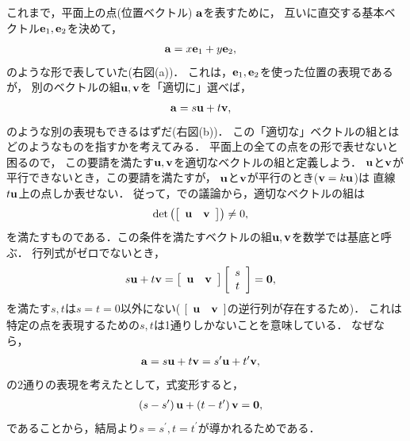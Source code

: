 これまで，平面上の点(位置ベクトル) ${\bf a}$を表すために，
互いに直交する基本ベクトル${\bf e}_{1},{\bf e}_{2}$を決めて，
\begin{align}
{\bf a} & =x{\bf e}_{1}+y{\bf e}_{2}, \label{a=xe1+ye2_2D}
\end{align}
のような形で表していた(右図(a))．
これは，${\bf e}_{1},{\bf e}_{2}$を使った位置の表現であるが，
別のベクトルの組${\bf u},{\bf v}$を「適切に」選べば，
%
\begin{align}
{\bf a} & =s{\bf u}+t{\bf v}, \label{LA:a=su+tv_basis}
\end{align}
%
のような別の表現もできるはずだ(右図(b))．
この「適切な」ベクトルの組とはどのようなものを指すかを考えてみる．
平面上の全ての点をの形で表せないと困るので，
この要請を満たす${\bf u},{\bf v}$を適切なベクトルの組と定義しよう．
${\bf u}$と${\bf v}$が平行できないとき，この要請を満たすが，
${\bf u}$と${\bf v}$が平行のとき(${\bf v}=k{\bf u}$)は
直線$t{\bf u}$上の点しか表せない．
従って，での議論から，適切なベクトルの組は
\begin{align}
\det\left(\left[\begin{array}{cc}
{\bf u} & {\bf v}\end{array}\right]\right) & \neq0, \label{LA:detA0_basis_2D}
\end{align}
を満たすものである．この条件を満たすベクトルの組${\bf u},{\bf v}$を数学では基底と呼ぶ．
行列式がゼロでないとき，
\begin{align}
s{\bf u}+t{\bf v} & =\left[\begin{array}{cc}
{\bf u} & {\bf v}\end{array}\right]\left[\begin{array}{c}
s\\
t
\end{array}\right]={\bf 0},
\end{align}
を満たす$s,t$は$s=t=0$以外にない(
$[\begin{array}{cc}
{\bf u} & {\bf v}\end{array}]$の逆行列が存在するため)．
これは特定の点を表現するための$s,t$は1通りしかないことを意味している．
なぜなら，
%
\begin{align}
{\bf a} & =s{\bf u}+t{\bf v}=s^{\prime}{\bf u}+t^{\prime}{\bf v},
\end{align}
の2通りの表現を考えたとして，式変形すると，
\begin{align}
\left(s-s^{\prime}\right){\bf u}+\left(t-t^{\prime}\right){\bf v} & ={\bf 0},
\end{align}
であることから，結局より$s=s^{\prime},t=t^{\prime}$が導かれるためである．
